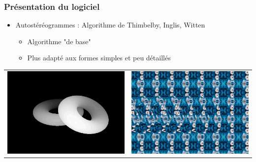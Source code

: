\documentclass{beamer}
\begin{document}
\begin{frame}
\frametitle{Présentation du logiciel}
\begin{itemize}[label=$\bullet$]
\item Autostéréogrammes : Algorithme de Thimbelby, Inglis, Witten \cite{stereogram}
	\begin{itemize}[label=$\circ$]
	\item Algorithme "de base"
	\item Plus adapté aux formes simples et peu détaillés
	\end{itemize}
\end{itemize}
\begin{tabular}{l|r}
\centering
\includegraphics[scale=0.22]{donutdepth.png}
&
\centering
\includegraphics[scale=0.22]{donut1.png}
\end{tabular}

\end{frame}
\end{document}
